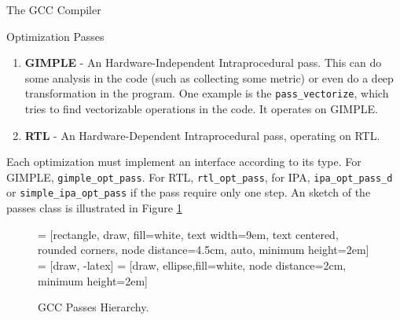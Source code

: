 \begin{section}{The GCC Compiler}
\begin{subsection}{Optimization Passes}
\begin{enumerate}
        \item \textbf{GIMPLE} - An Hardware-Independent Intraprocedural pass.
		This can do some analysis in the code (such as collecting some metric)
		or even do a deep transformation in the program. One example is
		the \texttt{pass\_vectorize}, which tries to find vectorizable operations
		in the code. It operates on GIMPLE.

        \item \textbf{RTL} - An Hardware-Dependent Intraprocedural pass, operating
		on RTL.
    \end{enumerate}

	Each optimization must implement an interface according to its type.
	For GIMPLE, \texttt{gimple\_opt\_pass}. For RTL, \texttt{rtl\_opt\_pass},
	for IPA, \texttt{ipa\_opt\_pass\_d} or \texttt{simple\_ipa\_opt\_pass} if the pass
	require only one step. An sketch of the passes class is illustrated in Figure \ref{fig:opt_uml}

\begin{figure}
 = [rectangle, draw, fill=white,
    text width=9em, text centered, rounded corners, node distance=4.5cm, auto, minimum height=2em]
 = [draw, -latex]
 = [draw, ellipse,fill=white, node distance=2cm,
    minimum height=2em]
\begin{center}
\end{center}
\caption{GCC Passes Hierarchy.}
\label{fig:opt_uml}
\end{figure}



\end{subsection}
\end{section}

